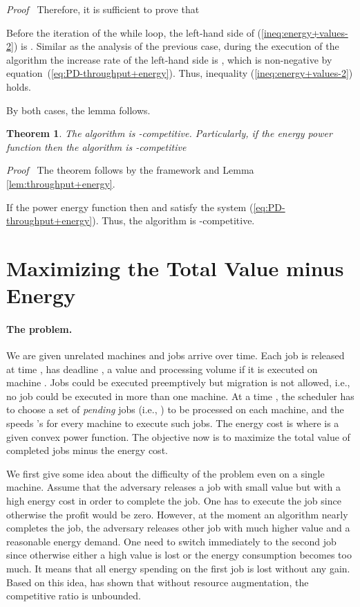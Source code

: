 \documentclass[11pt]{article}
\newenvironment{proof}{\noindent\emph{Proof\ }}{\hspace*{\fill}\medskip}
\newtheorem{theorem}{Theorem}
\begin{document}
\begin{proof}
Therefore, it is sufficient to prove that 

Before the iteration of the while loop, the left-hand side of (\ref{ineq:energy+values-2}) 
is . Similar as the analysis of the previous case, during the execution of the algorithm
the increase rate of the left-hand side is 
, which is non-negative by
equation~(\ref{eq:PD-throughput+energy}). Thus, inequality (\ref{ineq:energy+values-2})
holds.

By both cases, the lemma follows. 
\end{proof}

\begin{theorem}
The algorithm is -competitive. Particularly,
if the energy power function  then the algorithm 
is -competitive
\end{theorem}
\begin{proof}
The theorem follows by the framework
and Lemma \ref{lem:throughput+energy}.

If the power energy function  
then  and  satisfy the system 
(\ref{eq:PD-throughput+energy}). Thus, the algorithm is -competitive.
\end{proof}


\section{Maximizing the Total Value minus Energy}		\label{sec:values-energy}

\paragraph{The problem.}
We are given unrelated machines and jobs arrive over time. 
Each job  is released at time , has deadline , a value  
and processing volume  if it is executed on machine . 
Jobs could be executed preemptively but migration is not allowed, i.e., no job 
could be executed in more than one machine. 
At a time , the scheduler has to choose a set of \emph{pending} jobs (i.e., )  
to be processed on each machine, and 
the speeds 's for every machine  to execute such jobs.  
The energy cost is  where  is a given convex power function.
The objective now is to maximize the total value of completed jobs minus the energy cost. 

We first give some idea about the difficulty of the problem even on a single machine. 
Assume that the adversary releases a job with small value but with a high energy 
cost in order to complete the job. One has to execute the job since otherwise the profit would be zero.
However, at the moment an algorithm nearly completes the job, the adversary releases
other job with much higher value and a reasonable energy demand. One need to switch immediately 
to the second job since otherwise either a high value is lost or the energy consumption becomes 
too much. It means that all energy spending on the first job is lost without any gain. 
Based on this idea, \cite{PruhsStein10:How-to-Schedule-When} has shown that 
without resource augmentation, the competitive ratio 
is unbounded. 
\end{document}
